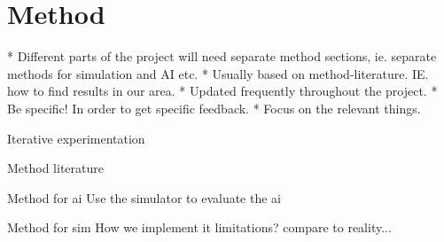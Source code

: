 \chapter{Method}
  * Different parts of the project will need separate method sections, ie. separate methods for simulation and AI etc.
  * Usually based on method-literature. IE. how to find results in our area.
  * Updated frequently throughout the project.
  * Be specific! In order to get specific feedback.
  * Focus on the relevant things.  
  





Iterative experimentation

Method literature

Method for ai
  Use the simulator to evaluate the ai
  
Method for sim
  How we implement it
  limitations?
  compare to reality...
  

